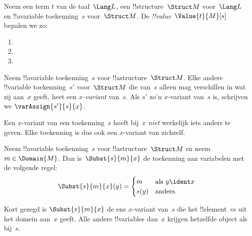 \documentclass[../../../include/open-logic-section]{subfiles}
\begin{document}
\begin{defn}
Neem een term $t$ van de taal~$\Lang L$, een !!{structure}~$\Struct M$
voor~$\Lang L$ en !!a{variable} toekenning~$s$ voor~$\Struct M$.
De \emph{!!{value}}~$\Value{t}{M}[s]$ bepalen we zo:
\begin{enumerate}
\item {}
\item {}
\item {}
\end{enumerate}
\end{defn}

\begin{defn}[$x$-variant]
Neem !!a{variable} toekenning~$s$ voor !!a{structure}~$\Struct M$.
Elke andere !!{variable} toekenning~$s'$ voor~$\Struct M$ die van~$s$
alleen mag verschillen in wat zij aan~$x$ geeft, heet een
\emph{$x$-variant} van~$s$. Als $s'$ zo'n $x$-variant van~$s$ is,
schrijven we $\varAssign{s'}{s}{x}$.
\end{defn}

\begin{explain}
Een $x$-variant van een toekenning~$s$ hoeft bij~$x$ \emph{niet}
werkelijk iets anders te geven. Elke toekenning is dus ook een
$x$-variant van zichzelf.
\end{explain}

\begin{defn}
  Neem !!a{variable} toekenning~$s$ voor !!a{structure}~$\Struct M$
  en neem $m \in \Domain{M}$. Dan is~$\Subst{s}{m}{x}$ de toekenning
  aan variabelen met de volgende regel:
  \[\Subst{s}{m}{x}(y) = \begin{cases}
    m & \text{als } y \ident x\\
    s(y) & \text{anders}.
  \end{cases}\]
\end{defn}

Kort gezegd is $\Subst{s}{m}{x}$ de ene $x$-variant van~$s$ die het
!!{element}~$m$ uit het domein aan~$x$ geeft. Alle andere
!!{variable}s dan~$x$ krijgen hetzelfde object als bij~$s$.
\end{document}
